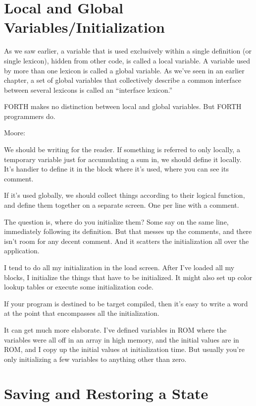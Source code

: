 \section{Local and Global Variables/Initialization}

As we saw earlier, a variable that is used exclusively within a single
definition (or single lexicon), hidden from other code, is called a local
variable. A variable used by more than one lexicon is called a global
variable. As we've seen in an earlier chapter, a set of global variables that
collectively describe a common interface between several lexicons is
called an ``interface lexicon.''

FORTH makes no distinction between local and global variables.
But FORTH programmers do.

Moore:

We should be writing for the reader. If something is referred to only locally,
a temporary variable just for accumulating a sum in, we should define it
locally. It's handier to define it in the block where it's used, where you can
see its comment.

If it's used globally, we should collect things according to their logical
function, and define them together on a separate screen. One per line with a
comment.

The question is, where do you initialize them? Some say on the same line,
immediately following its definition. But that messes up the comments,
and there isn't room for any decent comment. And it scatters the
initialization all over the application.

I tend to do all my initialization in the load screen. After I've loaded all my
blocks, I initialize the things that have to be initialized. It might also set
up color lookup tables or execute some initialization code.

If your program is destined to be target compiled, then it's easy to write a
word at the point that encompasses all the initialization.

It can get much more elaborate. I've defined variables in ROM where the
variables were all off in an array in high memory, and the initial values are
in ROM, and I copy up the initial values at initialization time. But usually
you're only initializing a few variables to anything other than zero.

\section{Saving and Restoring a State}

